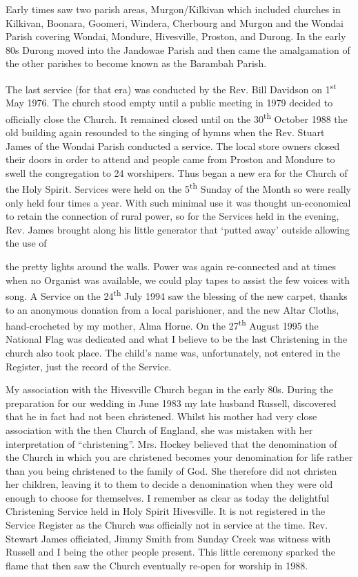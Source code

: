 Early times saw two parish areas, Murgon/Kilkivan which included
churches in Kilkivan, Boonara, Goomeri, Windera, Cherbourg and Murgon
and the Wondai Parish covering Wondai, Mondure, Hivesville, Proston, and
Durong. In the early 80s Durong moved into the Jandowae Parish and then
came the amalgamation of the other parishes to become known as the
Barambah Parish.

The last service (for that era) was conducted by the Rev. Bill Davidson
on 1\textsuperscript{st} May 1976. The church stood empty until a public
meeting in 1979 decided to officially close the Church. It remained
closed until on the 30\textsuperscript{th} October 1988 the old building
again resounded to the singing of hymns when the Rev. Stuart James of
the Wondai Parish conducted a service. The local store owners closed
their doors in order to attend and people came from Proston and Mondure
to swell the congregation to 24 worshipers. Thus began a new era for the
Church of the Holy Spirit. Services were held on the
5\textsuperscript{th} Sunday of the Month so were really only held four
times a year. With such minimal use it was thought un-economical to
retain the connection of rural power, so for the Services held in the
evening, Rev. James brought along his little generator that `putted
away' outside allowing the use of

the pretty lights around the walls. Power was again re-connected and at
times when no Organist was available, we could play tapes to assist the
few voices with song. A Service on the 24\textsuperscript{th} July 1994
saw the blessing of the new carpet, thanks to an anonymous donation from
a local parishioner, and the new Altar Cloths, hand-crocheted by my
mother, Alma Horne. On the 27\textsuperscript{th} August 1995 the
National Flag was dedicated and what I believe to be the last
Christening in the church also took place. The child's name was,
unfortunately, not entered in the Register, just the record of the
Service.

My association with the Hivesville Church began in the early 80s. During
the preparation for our wedding in June 1983 my late husband Russell,
discovered that he in fact had not been christened. Whilst his mother
had very close association with the then Church of England, she was
mistaken with her interpretation of ``christening''. Mrs. Hockey
believed that the denomination of the Church in which you are christened
becomes your denomination for life rather than you being christened to
the family of God. She therefore did not christen her children, leaving
it to them to decide a denomination when they were old enough to choose
for themselves. I remember as clear as today the delightful Christening
Service held in Holy Spirit Hivesville. It is not registered in the
Service Register as the Church was officially not in service at the
time. Rev. Stewart James officiated, Jimmy Smith from Sunday Creek was
witness with Russell and I being the other people present. This little
ceremony sparked the flame that then saw the Church eventually re-open
for worship in 1988.

